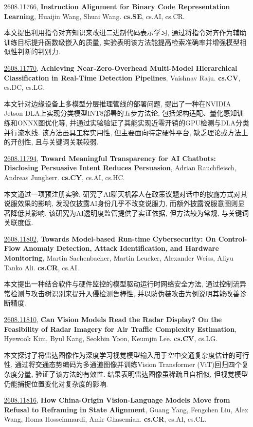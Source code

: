 \documentclass[9pt, a4paper]{article}
\theoremstyle{plain}
\theoremstyle{definition}
\theoremstyle{remark}
\newcommand{\arxivwithtarget}[3]{\hypertarget{#1}{}\href{https://arxiv.org/abs/#1}{#1}, \textbf{\textcolor{arxivblue}{#2}}, #3. }
\begin{document}
\arxivwithtarget{2608.11766}{Instruction Alignment for Binary Code Representation Learning}{Huaijin Wang, Shuai Wang}\textbf{cs.SE}, cs.AI, cs.CR.

本文提出利用指令对齐知识来改进二进制代码表示学习, 通过将指令对齐作为辅助训练目标提升函数级嵌入的质量, 实验表明该方法能提高检索准确率并增强模型相似性判断的判别力.


\arxivwithtarget{2608.11770}{Achieving Near-Zero-Overhead Multi-Model Hierarchical Classification in Real-Time Detection Pipelines}{Vaishnav Raju}\textbf{cs.CV}, cs.DC, cs.LG.

本文针对边缘设备上多模型分层推理管线的部署问题, 提出了一种在NVIDIA Jetson DLA上实现分类模型INT8部署的五步方法论, 包括架构适配、量化感知训练和ONNX图优化等, 并通过实验验证了其能实现近零开销的GPU检测与DLA分类并行流水线. 该方法虽具工程实用性, 但主要面向特定硬件平台, 缺乏理论或方法上的开创性, 且与关键词关联较弱.


\arxivwithtarget{2608.11794}{Toward Meaningful Transparency for AI Chatbots: Disclosing Persuasive Intent Reduces Persuasion}{Adrian Rauchfleisch, Andreas Jungherr}\textbf{cs.CY}, cs.AI, cs.HC.

本文通过一项预注册实验, 研究了AI聊天机器人在政策议题对话中的披露方式对其说服效果的影响, 发现仅披露AI身份几乎不改变说服力, 而额外披露说服意图则显著降低其影响. 该研究为AI透明度监管提供了实证依据, 但方法较为常规, 与关键词关联度低.


\arxivwithtarget{2608.11802}{Towards Model-based Run-time Cybersecurity: On Control-Flow Anomaly Detection, Attack Identification, and Hardware Monitoring}{Martin Sachenbacher, Martin Leucker, Alexander Weiss, Aliyu Tanko Ali}\textbf{cs.CR}, cs.AI.

本文提出一种结合软件与硬件监控的模型驱动运行时网络安全方法, 通过控制流异常检测与攻击树识别来提升入侵检测鲁棒性, 并以防伪装攻击为例说明其能改善诊断精度.


\arxivwithtarget{2608.11810}{Can Vision Models Read the Radar Display? On the Feasibility of Radar Imagery for Air Traffic Complexity Estimation}{Hyewook Kim, Byul Kang, Seokbin Yoon, Keumjin Lee}\textbf{cs.CV}, cs.LG.

本文探讨了将雷达图像作为深度学习视觉模型输入用于空中交通复杂度估计的可行性, 通过将交通态势编码为多通道图像并训练Vision Transformer (ViT)回归四个复杂度分量, 验证了该方法的有效性. 结果表明雷达图像虽稀疏且自相似, 但视觉模型仍能捕捉位置变化对复杂度的影响.


\arxivwithtarget{2608.11816}{How China-Origin Vision-Language Models Move from Refusal to Reframing in State Alignment}{Guang Yang, Fengchen Liu, Alex Wang, Homa Hosseinmardi, Amir Ghasemian}\textbf{cs.CR}, cs.AI, cs.CL.
\end{document}
